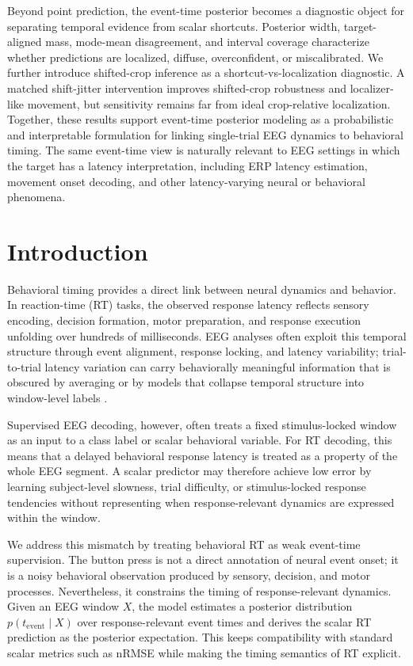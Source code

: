 \documentclass[12pt]{article}
\begin{document}
Beyond point prediction, the event-time posterior becomes a diagnostic object for separating temporal evidence from scalar shortcuts. Posterior width, target-aligned mass, mode-mean disagreement, and interval coverage characterize whether predictions are localized, diffuse, overconfident, or miscalibrated. We further introduce shifted-crop inference as a shortcut-vs-localization diagnostic. A matched shift-jitter intervention improves shifted-crop robustness and localizer-like movement, but sensitivity remains far from ideal crop-relative localization. Together, these results support event-time posterior modeling as a probabilistic and interpretable formulation for linking single-trial EEG dynamics to behavioral timing. The same event-time view is naturally relevant to EEG settings in which the target has a latency interpretation, including ERP latency estimation, movement onset decoding, and other latency-varying neural or behavioral phenomena.






\section{Introduction}

Behavioral timing provides a direct link between neural dynamics and behavior. In reaction-time (RT) tasks, the observed response latency reflects sensory encoding, decision formation, motor preparation, and response execution unfolding over hundreds of milliseconds. EEG analyses often exploit this temporal structure through event alignment, response locking, and latency variability; trial-to-trial latency variation can carry behaviorally meaningful information that is obscured by averaging or by models that collapse temporal structure into window-level labels \citep{Jung1998SingleTrialERP,Ouyang2017LatencyReview}.

Supervised EEG decoding, however, often treats a fixed stimulus-locked window as an input to a class label or scalar behavioral variable. For RT decoding, this means that a delayed behavioral response latency is treated as a property of the whole EEG segment. A scalar predictor may therefore achieve low error by learning subject-level slowness, trial difficulty, or stimulus-locked response tendencies without representing when response-relevant dynamics are expressed within the window.

We address this mismatch by treating behavioral RT as weak event-time supervision. The button press is not a direct annotation of neural event onset; it is a noisy behavioral observation produced by sensory, decision, and motor processes. Nevertheless, it constrains the timing of response-relevant dynamics. Given an EEG window \(X\), the model estimates a posterior distribution \(p(t_{\mathrm{event}}\mid X)\) over response-relevant event times and derives the scalar RT prediction as the posterior expectation. This keeps compatibility with standard scalar metrics such as nRMSE while making the timing semantics of RT explicit.
\end{document}
